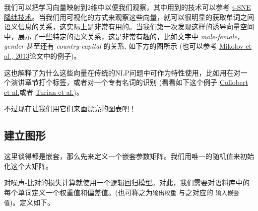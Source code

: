 我们可以把学习向量映射到2维中以便我们观察，其中用到的技术可以参考
\href{http://lvdmaaten.github.io/tsne/}{t-SNE
降纬技术}。当我们用可视化的方式来观察这些向量，就可以很明显的获取单词之间语义信息的关系，这实际上是非常有用的。当我们第一次发现这样的诱导向量空间中，展示了一些特定的语义关系，这是非常有趣的，比如文字中
\emph{male-female}，\emph{gender} 甚至还有 \emph{country-capital}
的关系, 如下方的图所示 (也可以参考
\href{http://www.aclweb.org/anthology/N13-1090}{Mikolov et al.,
2013}论文中的例子)。

这也解释了为什么这些向量在传统的NLP问题中可作为特性使用，比如用在对一个演讲章节打个标签，或者对一个专有名词的识别
(看看如下这个例子 \href{http://arxiv.org/pdf/1103.0398v1.pdf}{Collobert
et al.}或者 \href{http://www.aclweb.org/anthology/P10-1040}{Turian et
al.})。

不过现在让我们用它们来画漂亮的图表吧！

\subsection{建立图形 }\label{ux5efaux7acbux56feux5f62}

这里谈得都是嵌套，那么先来定义一个嵌套参数矩阵。我们用唯一的随机值来初始化这个大矩阵。

\begin{Shaded}
\begin{Highlighting}[]
\OperatorTok{=} 
    \OperatorTok{-}\NormalTok{, }\NormalTok{))}
\end{Highlighting}
\end{Shaded}

对噪声-比对的损失计算就使用一个逻辑回归模型。对此，我们需要对语料库中的每个单词定义一个权重值和偏差值。(也可称之为\texttt{输出权重}
与之对应的 \texttt{输入嵌套值})。定义如下。

\begin{Shaded}
\begin{Highlighting}[]
\OperatorTok{=} 
                      \OperatorTok{=} \OperatorTok{/} 
\OperatorTok{=} 
\end{Highlighting}
\end{Shaded}

